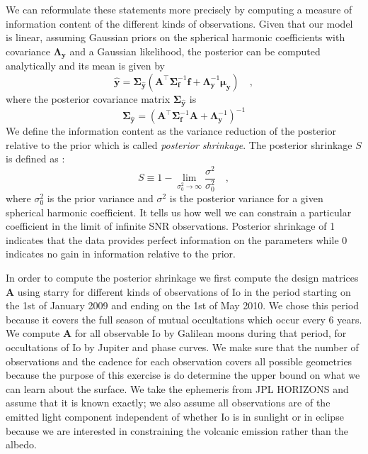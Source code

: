 \documentclass[modern]{aastex62}
\begin{document}
We can reformulate these statements more precisely by computing a measure of information content of the different kinds of observations.
Given that our model is linear, assuming Gaussian priors on the spherical harmonic coefficients with covariance $\boldsymbol{\Lambda}_\mathbf{y}$ and a Gaussian likelihood, the posterior can be computed analytically and its mean is given by
\begin{equation}
    \widehat{\mathbf{y}}=\boldsymbol{\Sigma}_{\hat{\mathbf{y}}}\left(\mathbf{A}^{\top} \boldsymbol{\Sigma}_{\mathbf{f}}^{-1} \mathbf{f}+\boldsymbol{\Lambda}_{\mathbf{y}}^{-1} \boldsymbol{\mu}_{\mathbf{y}}\right)
    \quad,
\end{equation}
where the posterior covariance matrix $\boldsymbol{\Sigma}_{\hat{\mathbf{y}}}$ is 
\begin{equation}
\boldsymbol{\Sigma}_{\hat{\mathbf{y}}}=\left( \mathbf{A}^{\top} \boldsymbol{\Sigma}_{\mathbf{f}}^{-1} \mathbf{A} +\boldsymbol{\Lambda}_{\mathbf{y}}^{-1}\right)^{-1}
\end{equation}
We define the information content as the variance reduction of the posterior relative to the prior which is called \emph{posterior shrinkage}.
The posterior shrinkage $S$ is defined as \citep{luger2021a,betancourt2018}:
\begin{equation}
S \equiv 1-\lim _{\sigma_{0}^{2} \rightarrow \infty} \frac{\sigma^{2}}{\sigma_{0}^{2}}
    \quad,
\end{equation}
where $\sigma^2_0$ is the prior variance and $\sigma^2$ is the posterior variance for a given spherical harmonic coefficient.
It tells us how well we can constrain a particular coefficient in the limit of infinite SNR observations.
Posterior shrinkage of 1 indicates that the data provides perfect information on the parameters while 0 indicates no gain in information relative to the prior.

In order to compute the posterior shrinkage we first compute the design matrices $\mathbf{A}$ using \textsf{starry} for different kinds of observations of Io in the period starting on the 1st of January 2009 and ending on the 1st of May 2010.
We chose this period because it covers the full season of mutual occultations which occur every 6 years.
We compute $\mathbf{A}$ for all observable Io by Galilean moons during that period, for occultations of Io by Jupiter and phase curves.
We make sure that the number of observations and the cadence for each observation covers all possible geometries because the purpose of this exercise is do determine the upper bound on what we can learn about the surface. 
We take the ephemeris from \textsf{JPL HORIZONS} and assume that it is known exactly; we also assume all observations are of the emitted light component independent of whether Io is in sunlight or in eclipse because we are interested in constraining the volcanic emission rather than the albedo.
\end{document}
